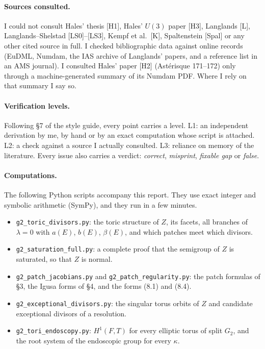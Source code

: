 \documentclass[12pt,letterpaper]{article}
\newcommand{\Lv}[1]{\textsf{L#1}}
\theoremstyle{definition}
\begin{document}
\paragraph{Sources consulted.} I could not consult Hales' thesis [H1], Hales'
$U(3)$ paper [H3], Langlands [L], Langlands--Shelstad [LS0]--[LS3],
Kempf et al.\ [K], Spaltenstein [Spal] or any other cited source in full.
I checked bibliographic data against online records (EuDML, Numdam, the IAS
archive of Langlands' papers, and a reference list in an AMS journal). I
consulted Hales' paper [H2] (Ast\'erisque 171--172) only through a
machine-generated summary of its Numdam PDF. Where I rely on that summary I say
so.

\paragraph{Verification levels.} Following \S7 of the style guide, every
point carries a level.
\Lv{1}: an independent derivation by me, by hand or by an exact computation
whose script is attached.
\Lv{2}: a check against a source I actually consulted.
\Lv{3}: reliance on memory of the literature.
Every issue also carries a verdict: \emph{correct}, \emph{misprint},
\emph{fixable gap} or \emph{false}.

\paragraph{Computations.} The following Python scripts accompany this report.
They use exact integer and symbolic arithmetic (SymPy), and they run in a few
minutes.
\begin{itemize}
\item \texttt{g2\_toric\_divisors.py}: the toric structure of $Z$, its facets,
all branches of $\lambda=0$ with $a(E)$, $b(E)$, $\beta(E)$, and which patches
meet which divisors.
\item \texttt{g2\_saturation\_full.py}: a complete proof that the semigroup of
$Z$ is saturated, so that $Z$ is normal.
\item \texttt{g2\_patch\_jacobians.py} and \texttt{g2\_patch\_regularity.py}:
the patch formulas of \S3, the Igusa forms of \S4, and the forms (8.1) and
(8.4).
\item \texttt{g2\_exceptional\_divisors.py}: the singular torus orbits of $Z$
and candidate exceptional divisors of a resolution.
\item \texttt{g2\_tori\_endoscopy.py}: $H^1(F,T)$ for every elliptic torus of
split $G_2$, and the root system of the endoscopic group for every $\kappa$.
\end{itemize}
\end{document}
